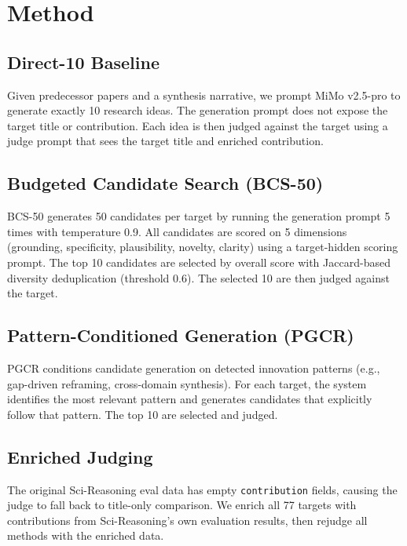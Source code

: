 \documentclass[wcp]{jmlr}
\begin{document}
\section{Method}\label{sec:method}

\subsection{Direct-10 Baseline}

Given predecessor papers and a synthesis narrative, we prompt MiMo v2.5-pro to generate exactly 10 research ideas. The generation prompt does not expose the target title or contribution. Each idea is then judged against the target using a judge prompt that sees the target title and enriched contribution.

\subsection{Budgeted Candidate Search (BCS-50)}

BCS-50 generates 50 candidates per target by running the generation prompt 5 times with temperature 0.9. All candidates are scored on 5 dimensions (grounding, specificity, plausibility, novelty, clarity) using a target-hidden scoring prompt. The top 10 candidates are selected by overall score with Jaccard-based diversity deduplication (threshold 0.6). The selected 10 are then judged against the target.

\subsection{Pattern-Conditioned Generation (PGCR)}

PGCR conditions candidate generation on detected innovation patterns (e.g., gap-driven reframing, cross-domain synthesis). For each target, the system identifies the most relevant pattern and generates candidates that explicitly follow that pattern. The top 10 are selected and judged.

\subsection{Enriched Judging}

The original Sci-Reasoning eval data has empty \texttt{contribution} fields, causing the judge to fall back to title-only comparison. We enrich all 77 targets with contributions from Sci-Reasoning's own evaluation results, then rejudge all methods with the enriched data.
\end{document}
